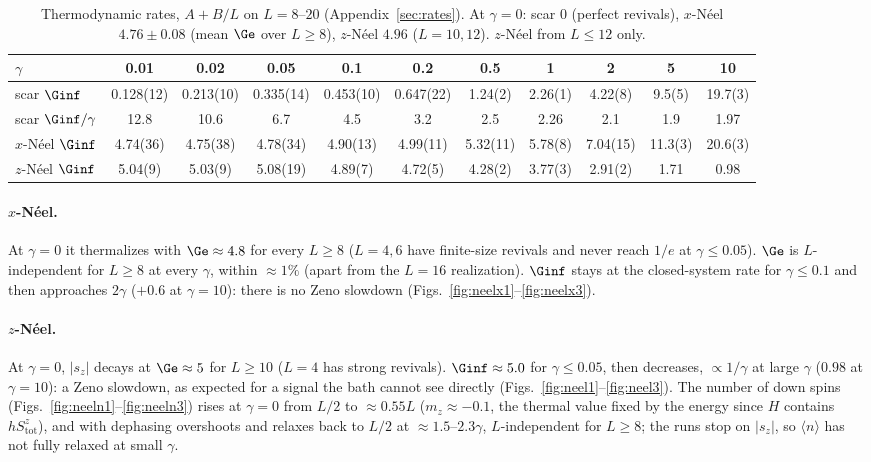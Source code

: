 \begin{table}[H]
\centering
\footnotesize
\setlength{\tabcolsep}{3pt}
\begin{tabular}{lcccccccccc}
\toprule
$\gamma$ & 0.01 & 0.02 & 0.05 & 0.1 & 0.2 & 0.5 & 1 & 2 & 5 & 10 \\
\midrule
scar $\Ginf$ & 0.128(12) & 0.213(10) & 0.335(14) & 0.453(10) & 0.647(22) & 1.24(2) & 2.26(1) & 4.22(8) & 9.5(5) & 19.7(3) \\
scar $\Ginf/\gamma$ & 12.8 & 10.6 & 6.7 & 4.5 & 3.2 & 2.5 & 2.26 & 2.1 & 1.9 & 1.97 \\
$x$-N\'eel $\Ginf$ & 4.74(36) & 4.75(38) & 4.78(34) & 4.90(13) & 4.99(11) & 5.32(11) & 5.78(8) & 7.04(15) & 11.3(3) & 20.6(3) \\
$z$-N\'eel $\Ginf$ & 5.04(9) & 5.03(9) & 5.08(19) & 4.89(7) & 4.72(5) & 4.28(2) & 3.77(3) & 2.91(2) & 1.71 & 0.98 \\
\bottomrule
\end{tabular}
\caption{Thermodynamic rates, $A + B/L$ on $L = 8$--$20$ (Appendix~\ref{sec:rates}). At $\gamma = 0$: scar $0$ (perfect revivals), $x$-N\'eel $4.76 \pm 0.08$ (mean $\Ge$ over $L \ge 8$), $z$-N\'eel $4.96$ ($L = 10, 12$). $z$-N\'eel from $L \le 12$ only.}
\label{tab:ginf}
\end{table}

\paragraph{$x$-N\'eel.} At $\gamma = 0$ it thermalizes with $\Ge \approx 4.8$ for every $L \ge 8$ ($L = 4, 6$ have finite-size revivals and never reach $1/e$ at $\gamma \le 0.05$). $\Ge$ is $L$-independent for $L \ge 8$ at every $\gamma$, within $\approx 1\%$ (apart from the $L = 16$ realization). $\Ginf$ stays at the closed-system rate for $\gamma \le 0.1$ and then approaches $2\gamma$ ($+0.6$ at $\gamma = 10$): there is no Zeno slowdown (Figs.~\ref{fig:neelx1}--\ref{fig:neelx3}).

\paragraph{$z$-N\'eel.} At $\gamma = 0$, $\lvert s_z\rvert$ decays at $\Ge \approx 5$ for $L \ge 10$ ($L = 4$ has strong revivals). $\Ginf \approx 5.0$ for $\gamma \le 0.05$, then decreases, $\propto 1/\gamma$ at large $\gamma$ ($0.98$ at $\gamma = 10$): a Zeno slowdown, as expected for a signal the bath cannot see directly (Figs.~\ref{fig:neel1}--\ref{fig:neel3}). The number of down spins (Figs.~\ref{fig:neeln1}--\ref{fig:neeln3}) rises at $\gamma = 0$ from $L/2$ to $\approx 0.55L$ ($m_z \approx -0.1$, the thermal value fixed by the energy since $H$ contains $hS^z_{\mathrm{tot}}$), and with dephasing overshoots and relaxes back to $L/2$ at $\approx 1.5$--$2.3\gamma$, $L$-independent for $L \ge 8$; the runs stop on $\lvert s_z\rvert$, so $\langle n\rangle$ has not fully relaxed at small $\gamma$.


